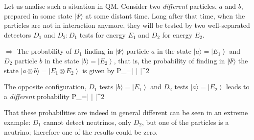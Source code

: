 \documentclass[12pt]{article}
\begin{document}
Let us analise such a situation in QM. Consider two
\emph{different} particles, $a$ and $b$, prepared in some
state $|\Psi\rangle$ at some distant time. Long after that time,
when the particles are not in interaction anymore,
they will be tested by two well-separated detectors $D_{1}$
and $D_{2}: D_{1}$ tests for energy $E_{1}$ and $D_{2}$ for energy $E_{2}$.

$\Rightarrow$ The probability of $D_{1}$ finding in $|\Psi\rangle$ particle $a$
in the state $|a\rangle=\left|E_{1}\right\rangle$ and $D_{2}$ particle $b$ in the
state $|b\rangle=\left|E_{2}\right\rangle$, that is, the probability of
finding in $|\Psi\rangle$ the state $|a \otimes b\rangle=\left|E_{1} \otimes E_{2}\right\rangle$
is given by
\be
P_{\Psi \rightarrow[E_{1}, E_{2}]}=|\langle 
{}\otimes 
{} | \Psi\rangle|^{2}
\ee

The opposite configuration, $D_1$ tests $|b\rangle=\left|E_{1}\right\rangle$ and
$D_{2}$ tests $|a\rangle=\left|E_{2}\right\rangle$ leads to a \emph{different} probability
\be
P_{\Psi \rightarrow[E_{2}, E_{1}]}=|\langle 
{}\otimes 
{} | \Psi\rangle|^{2}
\ee

That these probabilities are indeed in general different
can be seen in an extreme example: $D_{1}$ cannot detect
neutrinos, only $D_{2}$, but one of the particles is a neutrino;
therefore one of the results could be zero.
\end{document}
